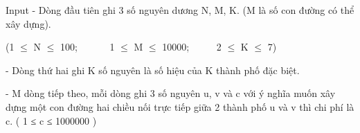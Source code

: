 Input
- Dòng đầu tiên ghi 3 số nguyên dương N, M, K. (M là số con đường có thể xây dựng).

(1  $\le$  N  $\le$  100;       1  $\le$  M  $\le$  10000;      2  $\le$  K  $\le$  7)

- Dòng thứ hai ghi K số nguyên là số hiệu của K thành phố đặc biệt.

- M dòng tiếp theo, mỗi dòng ghi 3 số nguyên u, v và c với ý nghĩa muốn xây dựng một con đường hai chiều nối trực tiếp giữa 2 thành phố u và v thì chi phí là c. ( 1 ≤ c ≤ 1000000 )

 